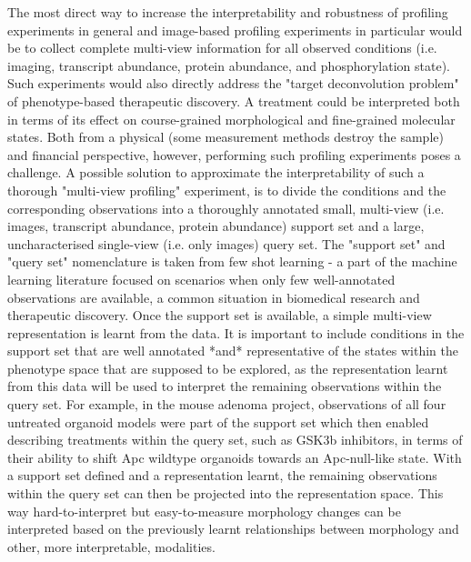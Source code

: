 \begin{flushleft}
The most direct way to increase the interpretability and robustness of profiling experiments in general and image-based profiling experiments in particular would be to collect complete multi-view information for all observed conditions (i.e. imaging, transcript abundance, protein abundance, and phosphorylation state). Such experiments would also directly address the "target deconvolution problem" of phenotype-based therapeutic discovery. A treatment could be interpreted both in terms of its effect on course-grained morphological and fine-grained molecular states. Both from a physical (some measurement methods destroy the sample) and financial perspective, however, performing such profiling experiments poses a challenge. A possible solution to approximate the interpretability of such a thorough "multi-view profiling" experiment, is to divide the conditions and the corresponding observations into a thoroughly annotated small, multi-view (i.e. images, transcript abundance, protein abundance) support set and a large, uncharacterised single-view (i.e. only images) query set. The "support set" and "query set" nomenclature is taken from few shot learning - a part of the machine learning literature focused on scenarios when only few well-annotated observations are available, a common situation in biomedical research and therapeutic discovery. Once the support set is available, a simple multi-view representation is learnt from the data. It is important to include conditions in the support set that are well annotated *and* representative of the states within the phenotype space that are supposed to be explored, as the representation learnt from this data will be used to interpret the remaining observations within the query set. For example, in the mouse adenoma project, observations of all four untreated organoid models were part of the support set which then enabled describing treatments within the query set, such as GSK3b inhibitors, in terms of their ability to shift Apc wildtype organoids towards an Apc-null-like state. With a support set defined and a representation learnt, the remaining observations within the query set can then be projected into the representation space. This way hard-to-interpret but easy-to-measure morphology changes can be interpreted based on the previously learnt relationships between morphology and other, more interpretable, modalities.
\bigbreak


\end{flushleft}
